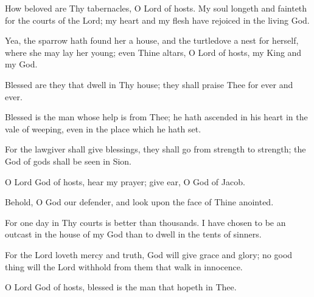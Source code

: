 How beloved are Thy tabernacles, O Lord of hosts. My soul longeth and fainteth for the courts of the Lord; my heart and my flesh have rejoiced in the living God.

Yea, the sparrow hath found her a house, and the turtledove a nest for herself, where she may lay her young; even Thine altars, O Lord of hosts, my King and my God.

Blessed are they that dwell in Thy house; they shall praise Thee for ever and ever.

Blessed is the man whose help is from Thee; he hath ascended in his heart in the vale of weeping, even in the place which he hath set.

For the lawgiver shall give blessings, they shall go from strength to strength; the God of gods shall be seen in Sion.

O Lord God of hosts, hear my prayer; give ear, O God of Jacob.

Behold, O God our defender, and look upon the face of Thine anointed.

For one day in Thy courts is better than thousands. I have chosen to be an outcast in the house of my God than to dwell in the tents of sinners.

For the Lord loveth mercy and truth, God will give grace and glory; no good thing will the Lord withhold from them that walk in innocence.

O Lord God of hosts, blessed is the man that hopeth in Thee.
